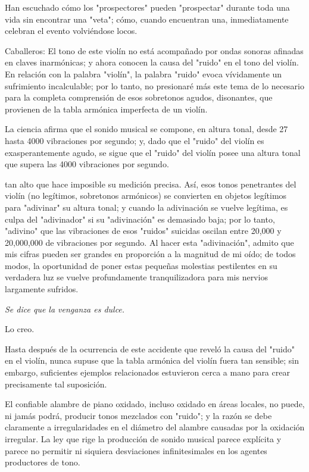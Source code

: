 \documentclass[12pt]{book}
\begin{document}
Han escuchado cómo los "prospectores" pueden "prospectar" durante toda una vida sin encontrar una "veta"; cómo, cuando encuentran una, inmediatamente celebran el evento volviéndose locos.

Caballeros: El tono de este violín no está acompañado por ondas sonoras afinadas en claves inarmónicas; y ahora conocen la causa del "ruido" en el tono del violín. En relación con la palabra "violín", la palabra "ruido" evoca vívidamente un sufrimiento incalculable; por lo tanto, no presionaré más este tema de lo necesario para la completa comprensión de esos sobretonos agudos, disonantes, que provienen de la tabla armónica imperfecta de un violín.

La ciencia afirma que el sonido musical se compone, en altura tonal, desde 27 hasta 4000 vibraciones por segundo; y, dado que el "ruido" del violín es exasperantemente agudo, se sigue que el "ruido" del violín posee una altura tonal que supera las 4000 vibraciones por segundo.

tan alto que hace imposible su medición precisa. Así, esos tonos penetrantes del violín (no legítimos, sobretonos armónicos) se convierten en objetos legítimos para "adivinar" su altura tonal; y cuando la adivinación se vuelve legítima, es culpa del "adivinador" si su "adivinación" es demasiado baja; por lo tanto, "adivino" que las vibraciones de esos "ruidos" suicidas oscilan entre 20,000 y 20,000,000 de vibraciones por segundo. Al hacer esta "adivinación", admito que mis cifras pueden ser grandes en proporción a la magnitud de mi oído; de todos modos, la oportunidad de poner estas pequeñas molestias pestilentes en su verdadera luz se vuelve profundamente tranquilizadora para mis nervios largamente sufridos.

\textit{Se dice que la venganza es dulce.}

Lo creo.

Hasta después de la ocurrencia de este accidente que reveló la causa del "ruido" en el violín, nunca supuse que la tabla armónica del violín fuera tan sensible; sin embargo, suficientes ejemplos relacionados estuvieron cerca a mano para crear precisamente tal suposición.

El confiable alambre de piano oxidado, incluso oxidado en áreas locales, no puede, ni jamás podrá, producir tonos mezclados con "ruido"; y la razón se debe claramente a irregularidades en el diámetro del alambre causadas por la oxidación irregular. La ley que rige la producción de sonido musical parece explícita y parece no permitir ni siquiera desviaciones infinitesimales en los agentes productores de tono.
\end{document}
